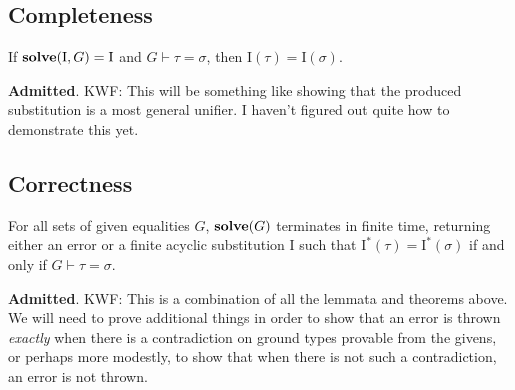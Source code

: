 \documentclass[10pt, letterpaper, oneside]{article}
\newcommand{\inertset}{\text{I}}
\newcommand{\Admitted}{{\color{red}\bf Admitted}}
\newcommand{\kwf}[1]{{\color{blue}KWF: #1}}
\begin{document}

\subsection{Completeness}

\begin{theorem}
  \label{theorem:solve-sound}
  If \(\text{\bf solve}(\inertset, G) = \inertset\) and \(G \vdash \tau = \sigma\), then \(\inertset(\tau) = \inertset(\sigma)\).
\end{theorem}

\Admitted. \kwf{This will be something like showing that the produced substitution is a most general unifier. I haven't figured out quite how to demonstrate this yet.}

\subsection{Correctness}

\begin{corollary}
  For all sets of {\sc given} equalities \(G\), \(\text{\bf solve}(G)\) terminates in finite time, returning either an error or a finite acyclic substitution \(\inertset\) such that \(\inertset^\ast(\tau) = \inertset^\ast(\sigma)\) if and only if \(G \vdash \tau = \sigma\).
\end{corollary}

\Admitted. \kwf{This is a combination of all the lemmata and theorems above. We will need to prove additional things in order to show that an error is thrown \emph{exactly} when there is a contradiction on ground types provable from the {\sc given}s, or perhaps more modestly, to show that when there is not such a contradiction, an error is not thrown.}
\end{document}
